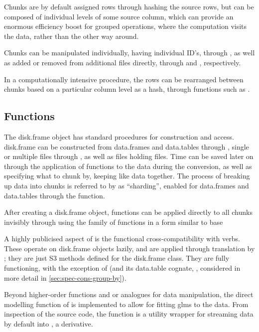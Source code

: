 Chunks are by default assigned rows through hashing the source rows, but
can be composed of individual levels of some source column, which can
provide an enormous efficiency boost for grouped operations, where the
computation visits the data, rather than the other way around.

Chunks can be manipulated individually, having individual ID's, through
, as well as added or
removed from additional  files directly, through
 and
, respectively.

In a computationally intensive procedure, the rows can be rearranged
between chunks based on a particular column level as a hash, through
functions such as .

\subsection{Functions}\label{sec:functions}

The disk.frame object has standard procedures for construction and
access. disk.frame can be constructed from data.frames and data.tables
through , single or
multiple  files through
, as well as 
files holding  files. Time can be saved later on through the
application of functions to the data during the conversion, as well as
specifying what to chunk by, keeping like data together. The process of
breaking up data into chunks is referred to by  as
``sharding'', enabled for data.frames and data.tables through the
 function.

After creating a disk.frame object, functions can be applied directly to
all chunks invisibly through using the
 family of functions in a form
similar to base \R{} 

A highly publicised aspect of  is the functional
cross-compatibility with  verbs. These operate on disk.frame
objects lazily, and are applied through translation by ; they
are just S3 methods defined for the disk.frame class. They are fully
functioning, with the exception of  (and its
data.table cognate, , considered in more detail in
\cref{sec:spec-cons-group-by}).

Beyond higher-order functions and  or  analogues for data
manipulation, the direct modelling function of
 is implemented to allow for
fitting glms to the data. From inspection of the source code, the
function is a utility wrapper for streaming  data by default
into , a  derivative.

